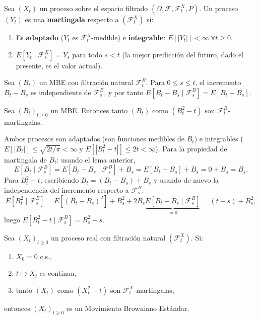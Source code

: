 \begin{definicion}[Martingala]
Sea $(X_t)$ un proceso sobre el espacio filtrado $(\Omega,\mathcal{F},\mathcal{F}_t^X,P)$. Un proceso $(Y_t)$ es una \textbf{martingala} respecto a $(\mathcal{F}_t^X)$ si:
\begin{enumerate}
    \item[(i)] Es \textbf{adaptado} ($Y_t$ es $\mathcal{F}_t^X$-medible) e \textbf{integrable}: $E[|Y_t|]<\infty\ \forall t\ge0$.
    \item[(ii)] $E[Y_t \mid \mathcal{F}_s^X] = Y_s$ para todo $s<t$ (la mejor predicción del futuro, dado el presente, es el valor actual).
\end{enumerate}
\end{definicion}

\begin{lema}[Ya demostrado]
Sea $(B_t)$ un MBE con filtración natural $\mathcal{F}_t^B$. Para $0\le s\le t$, el incremento $B_t-B_s$ es independiente de $\mathcal{F}_s^B$, y por tanto $E[B_t-B_s\mid\mathcal{F}_s^B]=E[B_t-B_s]$.
\end{lema}

\begin{teo}
Sea $(B_t)_{t\ge0}$ un MBE. Entonces tanto $(B_t)$ como $(B_t^2-t)$ son $\mathcal{F}_t^B$-martingalas.
\end{teo}
\begin{observacion}
Ambos procesos son adaptados (son funciones medibles de $B_t$) e integrables ($E[|B_t|]\le\sqrt{2t/\pi}<\infty$ y $E[|B_t^2-t|]\le 2t<\infty$). Para la propiedad de martingala de $B_t$: usando el lema anterior,
\[
E[B_t\mid\mathcal{F}_s^B] = E[B_t-B_s\mid\mathcal{F}_s^B] + B_s = E[B_t-B_s] + B_s = 0+B_s = B_s.
\]
Para $B_t^2-t$, escribiendo $B_t=(B_t-B_s)+B_s$ y usando de nuevo la independencia del incremento respecto a $\mathcal{F}_s^B$:
\[
E[B_t^2\mid\mathcal{F}_s^B] = E[(B_t-B_s)^2] + B_s^2 + 2B_s\underbrace{E[B_t-B_s\mid\mathcal{F}_s^B]}_{=0} = (t-s)+B_s^2,
\]
luego $E[B_t^2-t\mid\mathcal{F}_s^B] = B_s^2-s$.
\end{observacion}

\begin{teo}
Sea $(X_t)_{t\ge0}$ un proceso real con filtración natural $(\mathcal{F}_t^X)$. Si:
\begin{enumerate}
    \item[(i)] $X_0=0$ c.s.,
    \item[(ii)] $t\mapsto X_t$ es continua,
    \item[(iii)] tanto $(X_t)$ como $(X_t^2-t)$ son $\mathcal{F}_t^X$-martingalas,
\end{enumerate}
entonces $(X_t)_{t\ge0}$ es un Movimiento Browniano Estándar.
\end{teo}

